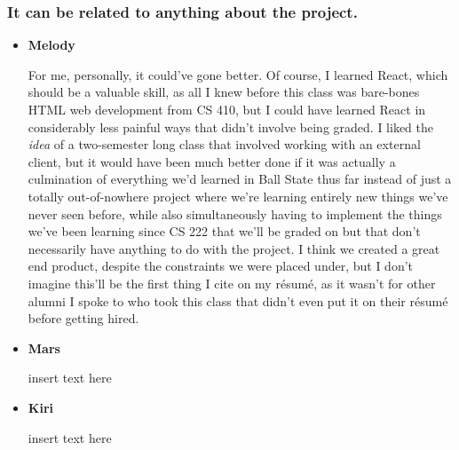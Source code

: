\documentclass[12pt, letterpaper]{article}
\begin{document}
\subsubsection{It can be related to anything about the project.}
\begin{itemize}
	\item{\textbf{Melody}}
	
		For me, personally, it could've gone better. Of course, I learned React, which should be a valuable skill, 
		as all I knew before this class was bare-bones HTML web development from CS 410, but I could have learned 
		React in considerably less painful ways that didn't involve being graded. I liked the \emph{idea} of a 
		two-semester long class that involved working with an external client, but it would have been much better 
		done if it was actually a culmination of everything we'd learned in Ball State thus far instead of just 
		a totally out-of-nowhere project where we're learning entirely new things we've never seen before, while 
		also simultaneously having to implement the things we've been learning since CS 222 that we'll be graded on but that 
		don't necessarily have anything to do with the project. I think we created a great end product, despite the 
		constraints we were placed under, but I don't imagine this'll be the first thing I cite on my résumé, as it 
		wasn't for other alumni I spoke to who took this class that didn't even put it on their résumé before getting 
		hired.
	
	\item{\textbf{Mars}}
	
		insert text here
	
	\item{\textbf{Kiri}}
	
		insert text here
\end{itemize}
\end{document}
